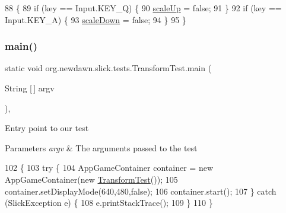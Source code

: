 \begin{DoxyCode}
88                                              \{
89         \textcolor{keywordflow}{if} (key == Input.KEY\_Q) \{
90             \mbox{\hyperlink{classorg_1_1newdawn_1_1slick_1_1tests_1_1_transform_test_aae392ece0303e93157331a226863f789}{scaleUp}} = \textcolor{keyword}{false};
91         \}
92         \textcolor{keywordflow}{if} (key == Input.KEY\_A) \{
93             \mbox{\hyperlink{classorg_1_1newdawn_1_1slick_1_1tests_1_1_transform_test_a3f3abdb195eb3e8d3f94035370279110}{scaleDown}} = \textcolor{keyword}{false};
94         \}
95     \}
\end{DoxyCode}
\mbox{\label{classorg_1_1newdawn_1_1slick_1_1tests_1_1_transform_test_a3c04f73037a551e84f971fa0511d13ff}} 
\subsubsection{\texorpdfstring{main()}{main()}}
{\footnotesize\ttfamily static void org.\+newdawn.\+slick.\+tests.\+Transform\+Test.\+main (\begin{DoxyParamCaption}\item[{String \mbox{[}$\,$\mbox{]}}]{argv }\end{DoxyParamCaption})\hspace{0.3cm}{\ttfamily [inline]}, {\ttfamily [static]}}

Entry point to our test


\begin{DoxyParams}{Parameters}
{\em argv} & The arguments passed to the test \\
\hline
\end{DoxyParams}

\begin{DoxyCode}
102                                            \{
103         \textcolor{keywordflow}{try} \{
104             AppGameContainer container = \textcolor{keyword}{new} AppGameContainer(\textcolor{keyword}{new} \mbox{\hyperlink{classorg_1_1newdawn_1_1slick_1_1tests_1_1_transform_test_a9842c748eea04a509dd47a049c877d35}{TransformTest}}());
105             container.setDisplayMode(640,480,\textcolor{keyword}{false});
106             container.start();
107         \} \textcolor{keywordflow}{catch} (SlickException e) \{
108             e.printStackTrace();
109         \}
110     \}
\end{DoxyCode}
\mbox{\label{classorg_1_1newdawn_1_1slick_1_1tests_1_1_transform_test_a928dd1a413227df47f44cf4d9ab05b98}} 
